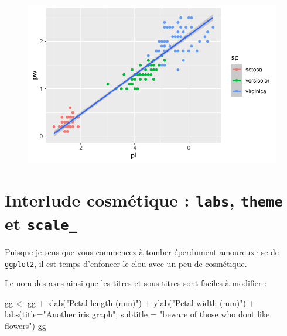 \documentclass[
  letterpaper,
  DIV=11,
  numbers=noendperiod]{scrreprt}
\newenvironment{Shaded}{\begin{snugshade}}{\end{snugshade}}
\newcommand{\AttributeTok}[1]{\textcolor[rgb]{0.40,0.45,0.13}{#1}}
\newcommand{\FunctionTok}[1]{\textcolor[rgb]{0.28,0.35,0.67}{#1}}
\newcommand{\NormalTok}[1]{\textcolor[rgb]{0.00,0.23,0.31}{#1}}
\newcommand{\OtherTok}[1]{\textcolor[rgb]{0.00,0.23,0.31}{#1}}
\newcommand{\SpecialCharTok}[1]{\textcolor[rgb]{0.37,0.37,0.37}{#1}}
\newcommand{\StringTok}[1]{\textcolor[rgb]{0.13,0.47,0.30}{#1}}
\begin{document}
\begin{figure}[H]

{\centering \includegraphics{ggplot2_files/figure-pdf/unnamed-chunk-15-1.pdf}

}

\end{figure}

\hypertarget{interlude-cosmuxe9tique-labs-theme-et-scale_}{%
\section{\texorpdfstring{Interlude cosmétique : \texttt{labs},
\texttt{theme} et
\texttt{scale\_}}{Interlude cosmétique : labs, theme et scale\_}}\label{interlude-cosmuxe9tique-labs-theme-et-scale_}}

Puisque je sens que vous commencez à tomber éperdument amoureux·se de
\texttt{ggplot2}, il est temps d'enfoncer le clou avec un peu de
cosmétique.

Le nom des axes ainsi que les titres et sous-titres sont faciles à
modifier :

\begin{Shaded}
\begin{Highlighting}[]
\NormalTok{gg }\OtherTok{\textless{}{-}}\NormalTok{ gg }\SpecialCharTok{+} 
  \FunctionTok{xlab}\NormalTok{(}\StringTok{"Petal length (mm)"}\NormalTok{) }\SpecialCharTok{+} 
  \FunctionTok{ylab}\NormalTok{(}\StringTok{"Petal width (mm)"}\NormalTok{) }\SpecialCharTok{+} 
  \FunctionTok{labs}\NormalTok{(}\AttributeTok{title=}\StringTok{"Another iris graph"}\NormalTok{, }\AttributeTok{subtitle =} \StringTok{"beware of those who don\textquotesingle{}t like flowers"}\NormalTok{)}
\NormalTok{gg}
\end{Highlighting}
\end{Shaded}
\end{document}
